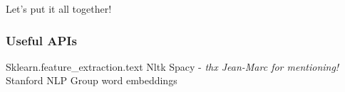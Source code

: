 \documentclass{beamer}
\begin{document}
\begin{frame}
\begin{block}{}
Let's put it all together!
\end{block}
\end{frame}

\begin{frame}[allowframebreaks]
  \frametitle<presentation>{Useful APIs}
    
  \begin{thebibliography}{10}
    
  \beamertemplatebookbibitems

    Sklearn.feature\_extraction.text
    Nltk 
    Spacy - \textit{thx Jean-Marc for mentioning!}
    Stanford NLP Group word embeddings 
  \end{thebibliography}
\end{frame}
\end{document}
